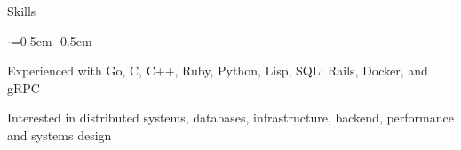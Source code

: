 \documentclass{resume} %
\begin{document}

\begin{rSection}{Skills}
  \vspace {0.2em}
  \begin{list}{$\cdot$}{\leftmargin=0.5em}
    \itemsep -0.5em \vspace{-0.3em}
    \item Experienced with Go, C, C++, Ruby, Python, Lisp, SQL; Rails, Docker, and gRPC
    \item Interested in distributed systems, databases, infrastructure, backend,
      performance and systems design
  \end{list}
  \vspace{0.1em}
\end{rSection}


\end{document}
